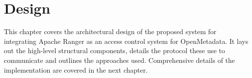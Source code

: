 \chapter{Design}

This chapter covers the architectural design of the proposed system for integrating Apache Ranger as an access control system for OpenMetadata. It lays out the high-level structural components, details the protocol these use to communicate and outlines the approaches used. Comprehensive details of the implementation are covered in the next chapter.